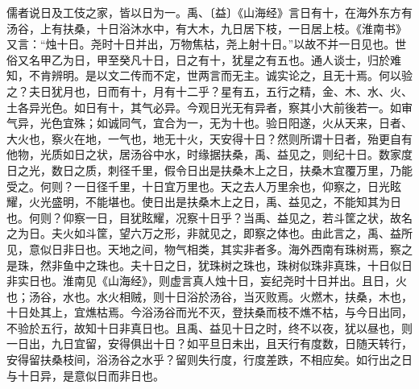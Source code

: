 \documentclass[]{article}
\begin{document}
儒者说日及工伎之家，皆以日为一。禹、〔益〕《山海经》言日有十，在海外东方有汤谷，上有扶桑，十日浴沐水中，有大木，九日居下枝，一日居上枝。《淮南书》又言：``烛十日。尧时十日并出，万物焦枯，尧上射十日。''以故不并一日见也。世俗又名甲乙为日，甲至癸凡十日，日之有十，犹星之有五也。通人谈士，归於难知，不肯辨明。是以文二传而不定，世两言而无主。诚实论之，且无十焉。何以验之？夫日犹月也，日而有十，月有十二乎？星有五，五行之精，金、木、水、火、土各异光色。如日有十，其气必异。今观日光无有异者，察其小大前後若一。如审气异，光色宜殊；如诚同气，宜合为一，无为十也。验日阳遂，火从天来，日者、大火也，察火在地，一气也，地无十火，天安得十日？然则所谓十日者，殆更自有他物，光质如日之状，居汤谷中水，时缘据扶桑，禹、益见之，则纪十日。数家度日之光，数日之质，刺径千里，假令日出是扶桑木上之日，扶桑木宜覆万里，乃能受之。何则？一日径千里，十日宜万里也。天之去人万里余也，仰察之，日光眩耀，火光盛明，不能堪也。使日出是扶桑木上之日，禹、益见之，不能知其为日也。何则？仰察一日，目犹眩耀，况察十日乎？当禹、益见之，若斗筐之状，故名之为日。夫火如斗筐，望六万之形，非就见之，即察之体也。由此言之，禹、益所见，意似日非日也。天地之间，物气相类，其实非者多。海外西南有珠树焉，察之是珠，然非鱼中之珠也。夫十日之日，犹珠树之珠也，珠树似珠非真珠，十日似日非实日也。淮南见《山海经》，则虚言真人烛十日，妄纪尧时十日并出。且日，火也；汤谷，水也。水火相贼，则十日浴於汤谷，当灭败焉。火燃木，扶桑，木也，十日处其上，宜燋枯焉。今浴汤谷而光不灭，登扶桑而枝不燋不枯，与今日出同，不验於五行，故知十日非真日也。且禹、益见十日之时，终不以夜，犹以昼也，则一日出，九日宜留，安得俱出十日？如平旦日未出，且天行有度数，日随天转行，安得留扶桑枝间，浴汤谷之水乎？留则失行度，行度差跌，不相应矣。如行出之日与十日异，是意似日而非日也。
\end{document}
